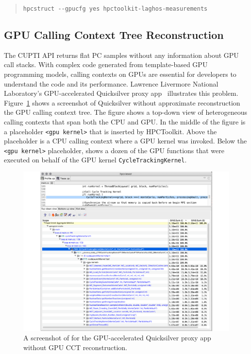 \begin{quote}
\begin{verbatim}
hpcstruct --gpucfg yes hpctoolkit-laghos-measurements
\end{verbatim}
\end{quote}


\subsection{GPU Calling Context Tree Reconstruction}
\label{nvidia-cct}



The CUPTI API returns flat PC samples without any information about GPU call stacks.
With complex code generated from template-based GPU programming models, calling contexts on GPUs are essential for developers to understand the code and its performance. Lawrence Livermore National Laboratory's GPU-accelerated Quicksilver proxy app~\cite{quicksilver} illustrates this problem. Figure~\ref{qs-no-cct} shows a \hpcviewer{} screenshot of Quicksilver without approximate reconstruction the GPU calling context tree. The figure shows a top-down view of heterogeneous calling contexts that span both the CPU and GPU. In the middle of the figure is a placeholder \verb|<gpu kernel>| that is inserted by HPCToolkit. Above the placeholder is a CPU calling context where a GPU kernel was invoked. Below the \verb|<gpu kernel>| placeholder, \hpcviewer{} shows a dozen of the GPU functions that were executed on behalf of the GPU kernel \verb|CycleTrackingKernel|.

\begin{figure}[t]
\centering
\includegraphics[width=\textwidth]{fig/qs-no-cct.pdf}
\caption{A screenshot of \hpcviewer{} for the GPU-accelerated Quicksilver proxy app without GPU CCT reconstruction.}
\label{qs-no-cct}
\end{figure}


